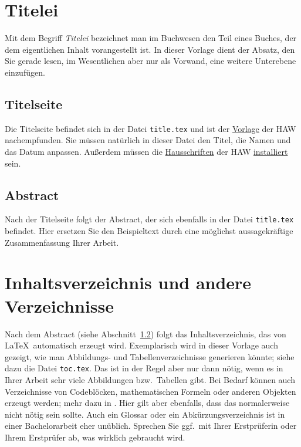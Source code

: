 \section{Titelei}

Mit dem Begriff \textit{Titelei} bezeichnet man im Buchwesen den Teil eines
Buches, der dem eigentlichen Inhalt vorangestellt ist.  In dieser Vorlage
dient der Absatz, den Sie gerade lesen, im Wesentlichen aber nur als Vorwand,
eine weitere Unterebene einzufügen.

\subsection{Titelseite}

Die Titelseite befindet sich in der Datei \texttt{title.tex} und ist der
\href{https://www.haw-hamburg.de/hochschule/hochschuleinheiten/presse-und-kommunikation/corporate-design/}{Vorlage}
der HAW nachempfunden.  Sie müssen natürlich in dieser Datei den Titel, die
Namen und das Datum anpassen.  Außerdem müssen die
\href{https://www.haw-hamburg.de/fileadmin/zentrale_PDF/Zentrale_Dokumente/Corporate_Design/HAW_Schriftenpaket.zip}{Hausschriften}
der HAW \href{https://support.microsoft.com/de-de/office/hinzuf\%C3\%BCgen-einer-schriftart-b7c5f17c-4426-4b53-967f-455339c564c1}{installiert} sein.

\subsection{Abstract}\label{sec-abstract}

Nach der Titelseite folgt der Abstract, der sich ebenfalls in der Datei
\texttt{title.tex} befindet.  Hier ersetzen Sie den Beispieltext durch eine
möglichst aussagekräftige Zusammenfassung Ihrer Arbeit.

\section{Inhaltsverzeichnis und andere Verzeichnisse}\label{sec-lists}

Nach dem Abstract (siehe Abschnitt~\ref{sec-abstract}) folgt das
Inhaltsverzeichnis, das von \LaTeX\ automatisch erzeugt wird.  Exemplarisch
wird in dieser Vorlage auch gezeigt, wie man Abbildungs- und
Tabellenverzeichnisse generieren könnte; siehe dazu die Datei
\texttt{toc.tex}.  Das ist in der Regel aber nur dann nötig, wenn es in Ihrer
Arbeit sehr viele Abbildungen bzw.\ Tabellen gibt.  Bei Bedarf können auch
Verzeichnisse von Codeblöcken, mathematischen Formeln oder anderen Objekten
erzeugt werden; mehr dazu in \parencite[Kap.\ 12]{voss}.  Hier gilt aber
ebenfalls, dass das normalerweise nicht nötig sein sollte.
Auch ein Glossar oder ein Abkürzungsverzeichnis ist in einer Bachelorarbeit
eher unüblich.  Sprechen Sie ggf.\ mit Ihrer Erstprüferin oder Ihrem
Erstprüfer ab, was wirklich gebraucht wird.

